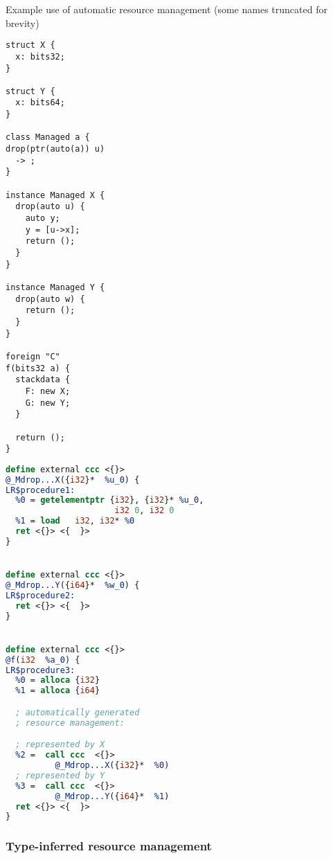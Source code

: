 \begin{listing}
    \small
    \caption{Example use of automatic resource management (some names truncated for brevity)}
    \label{lst:resource}
    \begin{center}
    \begin{minipage}{0.35\linewidth}
    \begin{lstlisting}
struct X {
  x: bits32;
}

struct Y {
  x: bits64;
}

class Managed a {
drop(ptr(auto(a)) u)
  -> ;
}

instance Managed X {
  drop(auto u) {
    auto y;
    y = [u->x];
    return ();
  }
}

instance Managed Y {
  drop(auto w) {
    return ();
  }
}

foreign "C"
f(bits32 a) {
  stackdata {
    F: new X;
    G: new Y;
  }

  return ();
}
    \end{lstlisting}
    \end{minipage}%
    \begin{minipage}{0.65\linewidth}
    \begin{lstlisting}[language=LLVM]
define external ccc <{}>
@_Mdrop...X({i32}*  %u_0) {
LR$procedure1:
  %0 = getelementptr {i32}, {i32}* %u_0,
                      i32 0, i32 0
  %1 = load   i32, i32* %0
  ret <{}> <{  }>
}


define external ccc <{}>
@_Mdrop...Y({i64}*  %w_0) {
LR$procedure2:
  ret <{}> <{  }>
}


define external ccc <{}>
@f(i32  %a_0) {
LR$procedure3:
  %0 = alloca {i32}
  %1 = alloca {i64}

  ; automatically generated
  ; resource management:

  ; represented by X
  %2 =  call ccc  <{}>
          @_Mdrop...X({i32}*  %0)
  ; represented by Y
  %3 =  call ccc  <{}>
          @_Mdrop...Y({i64}*  %1)
  ret <{}> <{  }>
}
    \end{lstlisting}
    \end{minipage}
    \end{center}
\end{listing}

\subsubsection{Type-inferred resource management}

